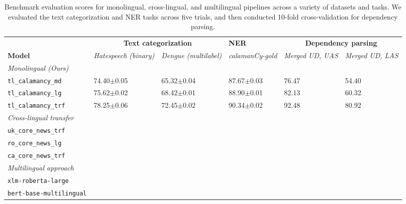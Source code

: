 \documentclass[../emnlp2023.tex]{subfiles}
\begin{document}
\begin{table*}[t]
\begin{tabular}{@{}p{4cm}p{2cm}p{2cm}p{2cm}p{2cm}p{2cm}@{}}
\toprule
                           & \multicolumn{2}{c}{\textbf{Text categorization}} & \textbf{NER} & \multicolumn{2}{c}{\textbf{Dependency parsing}}                         \\ 
\textbf{Model}             & \textit{Hatespeech (binary)} & \textit{Dengue (multilabel)} & \textit{calamanCy-gold} & \textit{Merged UD, UAS} & \textit{Merged UD, LAS} \\ \midrule 
\textit{Monolingual (Ours)}              \\
\texttt{tl\_calamancy\_md} & 74.40$\pm$0.05 & 65.32$\pm$0.04 & 87.67$\pm$0.03 & 76.47 & 54.40\\
\texttt{tl\_calamancy\_lg} & 75.62$\pm$0.02 & 68.42$\pm$0.01 & 88.90$\pm$0.01 & 82.13 & 60.32\\
\texttt{tl\_calamancy\_trf}& 78.25$\pm$0.06 & 72.45$\pm$0.02 & 90.34$\pm$0.02 & 92.48 & 80.92\\ \midrule
\textit{Cross-lingual transfer} \\
\texttt{uk\_core\_news\_trf} & \\
\texttt{ro\_core\_news\_lg} & \\
\texttt{ca\_core\_news\_trf} & \\ \midrule
\textit{Multilingual approach} \\
\texttt{xlm-roberta-large} \\
\texttt{bert-base-multilingual} \\
\bottomrule
\end{tabular}
\caption{
    Benchmark evaluation scores for monolingual, cross-lingual, and multilingual pipelines across a variety of datasets and tasks.
    We evaluated the text categorization and NER tasks across five trials, and then conducted 10-fold cross-validation for dependency parsing.
}
\label{table:results}
\end{table*}
\end{document}
